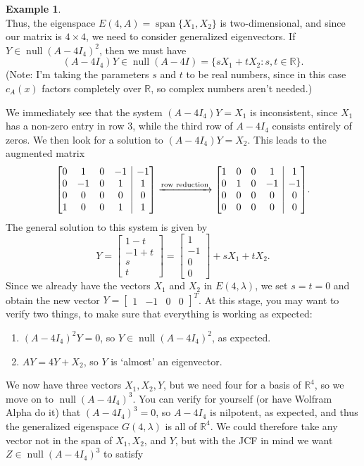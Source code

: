 \documentclass[12pt,letterpaper]{article}
\makeatletter
\theoremstyle{definition}
\newtheorem{example}{Example}
\newenvironment{amatrix}[1]{%
  \left[\begin{array}{@{}*{#1}{c}|c@{}}
}{%
  \end{array}\right]
}
\newcommand{\R}{\mathbb{R}}
\DeclareMathOperator{\spn}{span}
\DeclareMathOperator{\nul}{null}
\makeatother
\begin{document}
\begin{example}
\[\]
Thus, the eigenspace $E(4,A)=\spn\{X_1,X_2\}$ is two-dimensional, and since our matrix is $4\times 4$, we need to consider generalized eigenvectors. If $Y\in \nul (A-4I_4)^2$, then we must have
\[
 (A-4I_4)Y \in\nul (A-4I) = \{sX_1+tX_2 : s,t\in\R\}.
\]
(Note: I'm taking the parameters $s$ and $t$ to be real numbers, since in this case $c_A(x)$ factors completely over $\R$, so complex numbers aren't needed.)

We immediately see that the system $(A-4I_4)Y=X_1$ is inconsistent, since $X_1$ has a non-zero entry in row 3, while the third row of $A-4I_4$ consists entirely of zeros. We then look for a solution to $(A-4I_4)Y=X_2$. This leads to the augmented matrix
\[
 \begin{amatrix}{4}
  0&1&0&-1&-1\\0&-1&0&1&1\\0&0&0&0&0\\1&0&0&1&1
 \end{amatrix}\xrightarrow[]{\text{row reduction}}
 \begin{amatrix}{4}
  1&0&0&1&1\\0&1&0&-1&-1\\0&0&0&0&0\\0&0&0&0&0
 \end{amatrix}.
\]
The general solution to this system is given by
\[
 Y = \begin{bmatrix}1-t\\-1+t\\s\\t\end{bmatrix} = \begin{bmatrix}1\\-1\\0\\0\end{bmatrix}+sX_1+tX_2.
\]
Since we already have the vectors $X_1$ and $X_2$ in $E(4,\lambda)$, we set $s=t=0$ and obtain the new vector $Y=\begin{bmatrix}1&-1&0&0\end{bmatrix}^T$. At this stage, you may want to verify two things, to make sure that everything is working as expected:
\begin{enumerate}
 \item $(A-4I_4)^2Y=0$, so $Y\in \nul (A-4I_4)^2$, as expected.
 \item $AY = 4Y+X_2$, so $Y$ is `almost' an eigenvector.
\end{enumerate}
We now have three vectors $X_1,X_2,Y$, but we need four for a basis of $\R^4$, so we move on to $\nul (A-4I_4)^3$. You can verify for yourself (or have Wolfram Alpha do it) that $(A-4I_4)^3=0$, so $A-4I_4$ is nilpotent, as expected, and thus the generalized eigenspace $G(4,\lambda)$ is all of $\R^4$. We could therefore take any vector not in the span of $X_1, X_2$, and $Y$, but with the JCF in mind we want $Z\in\nul(A-4I_4)^3$ to satisfy

\end{example}
\end{document}
